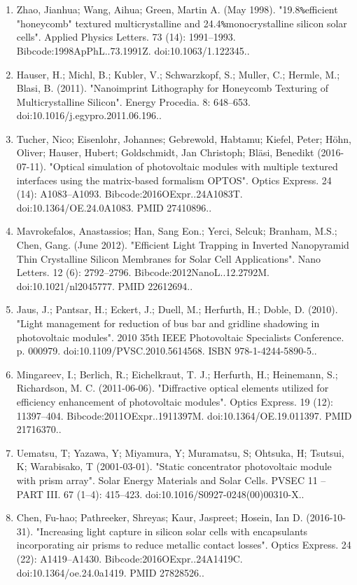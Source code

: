 \begin{enumerate}
\item Zhao, Jianhua; Wang, Aihua; Green, Martin A. (May 1998). "19.8\verb|%|efficient "honeycomb" textured multicrystalline and 24.4\verb|%|monocrystalline silicon solar cells". Applied Physics Letters. 73 (14): 1991–1993. Bibcode:1998ApPhL..73.1991Z. doi:10.1063/1.122345..
\item Hauser, H.; Michl, B.; Kubler, V.; Schwarzkopf, S.; Muller, C.; Hermle, M.; Blasi, B. (2011). "Nanoimprint Lithography for Honeycomb Texturing of Multicrystalline Silicon". Energy Procedia. 8: 648–653. doi:10.1016/j.egypro.2011.06.196..
\item Tucher, Nico; Eisenlohr, Johannes; Gebrewold, Habtamu; Kiefel, Peter; Höhn, Oliver; Hauser, Hubert; Goldschmidt, Jan Christoph; Bläsi, Benedikt (2016-07-11). "Optical simulation of photovoltaic modules with multiple textured interfaces using the matrix-based formalism OPTOS". Optics Express. 24 (14): A1083–A1093. Bibcode:2016OExpr..24A1083T. doi:10.1364/OE.24.0A1083. PMID 27410896..
\item Mavrokefalos, Anastassios; Han, Sang Eon.; Yerci, Selcuk; Branham, M.S.; Chen, Gang. (June 2012). "Efficient Light Trapping in Inverted Nanopyramid Thin Crystalline Silicon Membranes for Solar Cell Applications". Nano Letters. 12 (6): 2792–2796. Bibcode:2012NanoL..12.2792M. doi:10.1021/nl2045777. PMID 22612694..
\item Jaus, J.; Pantsar, H.; Eckert, J.; Duell, M.; Herfurth, H.; Doble, D. (2010). "Light management for reduction of bus bar and gridline shadowing in photovoltaic modules". 2010 35th IEEE Photovoltaic Specialists Conference. p. 000979. doi:10.1109/PVSC.2010.5614568. ISBN 978-1-4244-5890-5..
\item Mingareev, I.; Berlich, R.; Eichelkraut, T. J.; Herfurth, H.; Heinemann, S.; Richardson, M. C. (2011-06-06). "Diffractive optical elements utilized for efficiency enhancement of photovoltaic modules". Optics Express. 19 (12): 11397–404. Bibcode:2011OExpr..1911397M. doi:10.1364/OE.19.011397. PMID 21716370..
\item Uematsu, T; Yazawa, Y; Miyamura, Y; Muramatsu, S; Ohtsuka, H; Tsutsui, K; Warabisako, T (2001-03-01). "Static concentrator photovoltaic module with prism array". Solar Energy Materials and Solar Cells. PVSEC 11 – PART III. 67 (1–4): 415–423. doi:10.1016/S0927-0248(00)00310-X..
\item Chen, Fu-hao; Pathreeker, Shreyas; Kaur, Jaspreet; Hosein, Ian D. (2016-10-31). "Increasing light capture in silicon solar cells with encapsulants incorporating air prisms to reduce metallic contact losses". Optics Express. 24 (22): A1419–A1430. Bibcode:2016OExpr..24A1419C. doi:10.1364/oe.24.0a1419. PMID 27828526..

\end{enumerate}
